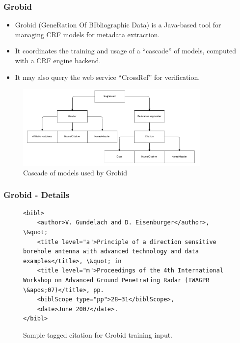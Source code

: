 \documentclass{beamer}
\begin{document}
\begin{frame}
\frametitle{Grobid}
\begin{itemize}
\item Grobid (GeneRation Of BIbliographic Data) is a Java-based tool for managing CRF models for metadata extraction.
\item It coordinates the training and usage of a ``cascade'' of models, computed with a CRF engine backend.
\item It may also query the web service ``CrossRef'' for verification.
\end{itemize}
\begin{figure}[!ht]
\center
\includegraphics[width=3.75in]{figures/cascade.pdf}
\caption{Cascade of models used by Grobid}
\end{figure}
\end{frame}


\begin{frame}[fragile]
\frametitle{Grobid - Details}

\begin{figure}
\lstset{language=XML}
\begin{lstlisting}
<bibl>
	<author>V. Gundelach and D. Eisenburger</author>, \&quot; 
	<title level="a">Principle of a direction sensitive borehole antenna with advanced technology and data examples</title>, \&quot; in 
	<title level="m">Proceedings of the 4th International Workshop on Advanced Ground Penetrating Radar (IWAGPR \&apos;07)</title>, pp. 
	<biblScope type="pp">28–31</biblScope>, 
	<date>June 2007</date>.
</bibl>
\end{lstlisting}
\caption{Sample tagged citation for Grobid training input.}
\end{figure}

\end{frame}

\end{document}
